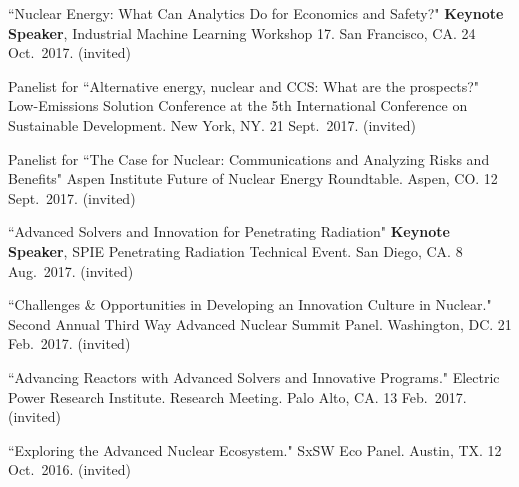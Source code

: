 \begin{bibsection}
\item ``Nuclear Energy: What Can Analytics Do for Economics and Safety?" \textbf{Keynote Speaker}, Industrial Machine Learning Workshop 17. San Francisco, CA. 24 Oct.\ 2017. (invited)

\item Panelist for ``Alternative energy, nuclear and CCS: What are the prospects?" Low-Emissions Solution Conference at the 5th International Conference on Sustainable Development. New York, NY. 21  Sept.\ 2017. (invited)

\item Panelist for ``The Case for Nuclear: Communications and Analyzing Risks and Benefits" Aspen Institute Future of Nuclear Energy Roundtable. Aspen, CO. 12  Sept.\ 2017. (invited)

\item ``Advanced Solvers and Innovation for Penetrating Radiation" \textbf{Keynote Speaker}, SPIE Penetrating Radiation Technical Event. San Diego, CA. 8 Aug.\ 2017. (invited)


\item ``Challenges \& Opportunities in Developing an Innovation Culture in Nuclear." Second Annual Third Way Advanced Nuclear Summit Panel. Washington, DC. 21 Feb.\ 2017. (invited)

\item ``Advancing Reactors with Advanced Solvers and Innovative Programs." Electric Power Research Institute. Research Meeting. Palo Alto, CA. 13 Feb.\ 2017. (invited)

\item ``Exploring the Advanced Nuclear Ecosystem." SxSW Eco Panel. Austin, TX. 12 Oct.\ 2016. (invited)





\end{bibsection}
